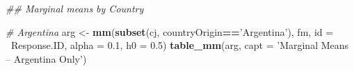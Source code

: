 \documentclass[12pt,a4paper,]{article}
\newenvironment{Shaded}{\begin{snugshade}}{\end{snugshade}}
\newcommand{\CommentTok}[1]{\textcolor[rgb]{0.56,0.35,0.01}{\textit{#1}}}
\newcommand{\DataTypeTok}[1]{\textcolor[rgb]{0.13,0.29,0.53}{#1}}
\newcommand{\FloatTok}[1]{\textcolor[rgb]{0.00,0.00,0.81}{#1}}
\newcommand{\KeywordTok}[1]{\textcolor[rgb]{0.13,0.29,0.53}{\textbf{#1}}}
\newcommand{\NormalTok}[1]{#1}
\newcommand{\OperatorTok}[1]{\textcolor[rgb]{0.81,0.36,0.00}{\textbf{#1}}}
\newcommand{\StringTok}[1]{\textcolor[rgb]{0.31,0.60,0.02}{#1}}
\begin{document}
\newpage

\begin{Shaded}
\begin{Highlighting}[]
\CommentTok{## Marginal means by Country}

\CommentTok{# Argentina}
\NormalTok{arg <-}\StringTok{ }\KeywordTok{mm}\NormalTok{(}\KeywordTok{subset}\NormalTok{(cj, countryOrigin}\OperatorTok{==}\StringTok{'Argentina'}\NormalTok{),  }
\NormalTok{        fm, }\DataTypeTok{id =} \OperatorTok{~}\NormalTok{Response.ID, }\DataTypeTok{alpha =} \FloatTok{0.1}\NormalTok{, }\DataTypeTok{h0 =} \FloatTok{0.5}\NormalTok{)}
\KeywordTok{table_mm}\NormalTok{(arg, }\DataTypeTok{capt =} \StringTok{'Marginal Means -- Argentina Only'}\NormalTok{)}
\end{Highlighting}
\end{Shaded}
\end{document}

